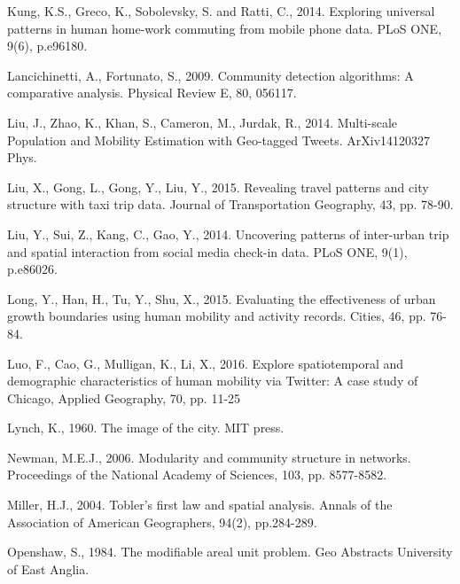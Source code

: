\documentclass[]{tGIS2e}
\begin{document}
\begin{thebibliography}{9}
Kung, K.S., Greco, K., Sobolevsky, S. and Ratti, C., 2014. Exploring universal patterns in human home-work commuting from mobile phone data. PLoS ONE, 9(6), p.e96180.

Lancichinetti, A., Fortunato, S., 2009. Community detection algorithms: A comparative analysis. Physical Review E, 80, 056117.

Liu, J., Zhao, K., Khan, S., Cameron, M., Jurdak, R., 2014. Multi-scale Population and Mobility Estimation with Geo-tagged Tweets. ArXiv14120327 Phys.

Liu, X., Gong, L., Gong, Y., Liu, Y., 2015. Revealing travel patterns and city structure with taxi trip data. Journal of Transportation Geography, 43, pp. 78-90.

Liu, Y., Sui, Z., Kang, C., Gao, Y., 2014. Uncovering patterns of inter-urban trip and spatial interaction from social media check-in data. PLoS ONE, 9(1), p.e86026.

Long, Y., Han, H., Tu, Y., Shu, X., 2015. Evaluating the effectiveness of urban growth boundaries using human mobility and activity records. Cities, 46, pp. 76-84.

Luo, F., Cao, G., Mulligan, K., Li, X., 2016. Explore spatiotemporal and demographic characteristics of human mobility via Twitter: A case study of Chicago, Applied Geography, 70, pp. 11-25

Lynch, K., 1960. The image of the city. MIT press.

Newman, M.E.J., 2006. Modularity and community structure in networks. Proceedings of the National Academy of Sciences, 103, pp. 8577-8582.

Miller, H.J., 2004. Tobler's first law and spatial analysis. Annals of the Association of American Geographers, 94(2), pp.284-289.

Openshaw, S., 1984. The modifiable areal unit problem. Geo Abstracts University of East Anglia.


\end{thebibliography}
\end{document}
